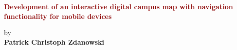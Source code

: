 \begin{titlepage}
	\strut
	\hfill
	\begin{center}
	\vspace{1cm}
		\Huge
		\begin{spacing}{.9}
			\textcolor{DarkRed}{\textbf{Development of an interactive digital campus map with navigation functionality for mobile devices}}\\
		\end{spacing}
		\vspace{0.8cm}
		\large
		by\\
		\vspace{0.8cm}
		\textbf{Patrick Christoph Zdanowski}\\
		\vspace{0.8cm}

\end{center}
\end{titlepage}
